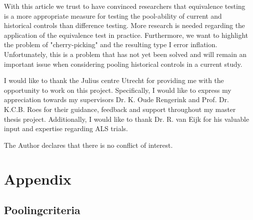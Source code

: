 \documentclass[Royal,sagev,times]{sagej}
\begin{document}
With this article we trust to have convinced researchers that equivalence testing is a more appropriate measure for testing the pool-ability of current and historical controls than difference testing. More research is needed regarding the application of the equivalence test in practice. Furthermore, we want to highlight the problem of "cherry-picking" and the resulting type I error inflation. Unfortunately, this is a problem that has not yet been solved and will remain an important issue when considering pooling historical controls in a current study.  

\begin{acks}
I would like to thank the Julius centre Utrecht for providing me with the opportunity to work on this project. Specifically, I would like to express my appreciation towards my supervisors Dr. K. Oude Rengerink and Prof. Dr. K.C.B. Roes for their guidance, feedback and support throughout my master thesis project. Additionally, I would like to thank Dr. R. van Eijk for his valuable input and expertise regarding ALS trials.
\end{acks}

\begin{dci}
The Author declares that there is no conflict of interest.
\end{dci}

 


\appendix 
\section{Appendix} 
\subsection{Poolingcriteria \label{A:Poolingcriteria}}
\end{document}
